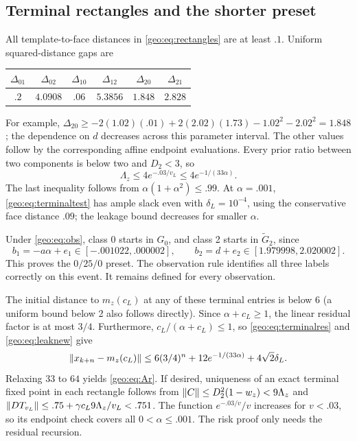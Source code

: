 \subsection{Terminal rectangles and the shorter preset}
All template-to-face distances in \eqref{geo:eq:rectangles} are at least $.1$.
Uniform squared-distance gaps are
\begin{center}
\setlength{\tabcolsep}{2pt}\small
\begin{tabular}{@{}cccccc@{}}\toprule
$\Delta_{01}$&$\Delta_{02}$&$\Delta_{10}$&$\Delta_{12}$&$\Delta_{20}$&$\Delta_{21}$\\\midrule
$.2$&$4.0908$&$.06$&$5.3856$&$1.848$&$2.828$\\\bottomrule
\end{tabular}
\end{center}
For example,
$\Delta_{20}\ge-2(1.02)(.01)+2(2.02)(1.73)-1.02^2-2.02^2=1.848$;
the dependence on $d$ decreases across this parameter interval. The other
values follow by the corresponding affine endpoint evaluations.
Every prior ratio between two components is below two and $D_2<3$, so
\begin{equation}\label{geo:eq:leaknew}
 \Lambda_z\le4e^{-.03/v_L}\le4e^{-1/(33\alpha)}.
\end{equation}
The last inequality follows from $\alpha(1+\alpha^2)\le.99$.
At $\alpha=.001$, \eqref{geo:eq:terminaltest} has ample slack even with
$\delta_L=10^{-4}$, using the conservative face distance $.09$;
the leakage bound decreases for smaller $\alpha$.

Under \eqref{geo:eq:obs}, class 0 starts in $G_0$, and class 2 starts in
$\widetilde G_2$, since
\[
 b_1=-a\alpha+e_1\in[-.001022,.000002],\qquad
 b_2=d+e_2\in[1.979998,2.020002].
\]
This proves the $0/25/0$ preset. The observation rule identifies all three
labels correctly on this event. It remains defined for every observation.

The initial distance to $m_z(c_L)$ at any of these terminal entries is below
6 (a uniform bound below 2 also follows directly). Since
$\alpha+c_L\ge1$, the linear residual factor is at most $3/4$. Furthermore,
$c_L/(\alpha+c_L)\le1$, so \eqref{geo:eq:terminalres} and
\eqref{geo:eq:leaknew} give
\[
 \lVert x_{k+n}-m_z(c_L)\rVert\le6(3/4)^n+12e^{-1/(33\alpha)}+4\sqrt2\delta_L.
\]
Relaxing $33$ to $64$ yields \eqref{geo:eq:Ar}. If desired, uniqueness of an
exact terminal fixed point in each rectangle follows from
$\lVert C\rVert\le D_2^2(1-w_z)<9\Lambda_z$ and
$\lVert DT_{v_L}\rVert\le.75+\gamma c_L9\Lambda_z/v_L<.751$.
The function $e^{-.03/v}/v$ increases for $v<.03$, so its endpoint check covers
all $0<\alpha\le.001$. The risk proof only needs the residual recursion.


